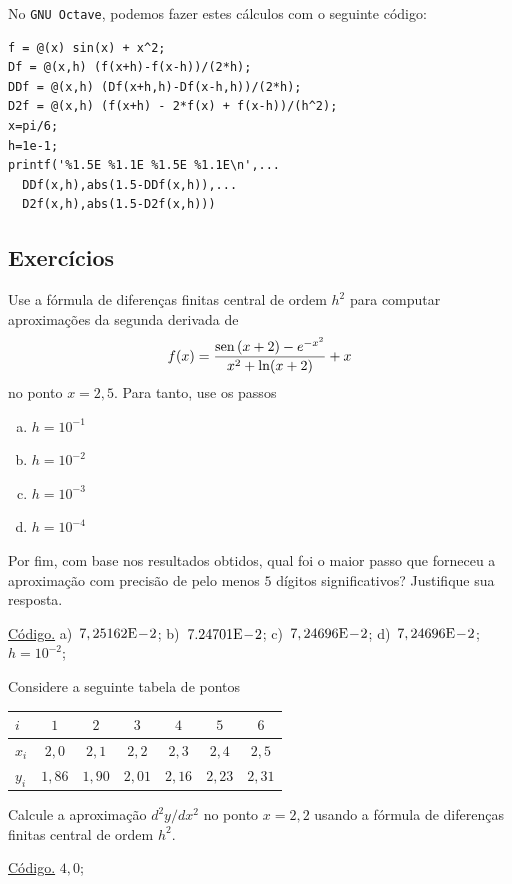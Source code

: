 \begin{ex}
No \verb+GNU Octave+, podemos fazer estes cálculos com o seguinte código:
\begin{verbatim}
f = @(x) sin(x) + x^2;
Df = @(x,h) (f(x+h)-f(x-h))/(2*h);
DDf = @(x,h) (Df(x+h,h)-Df(x-h,h))/(2*h);
D2f = @(x,h) (f(x+h) - 2*f(x) + f(x-h))/(h^2);
x=pi/6;
h=1e-1;
printf('%1.5E %1.1E %1.5E %1.1E\n',...
  DDf(x,h),abs(1.5-DDf(x,h)),...
  D2f(x,h),abs(1.5-D2f(x,h)))
\end{verbatim}
\end{ex}

\subsection*{Exercícios}

\begin{exer}\label{exer:d2fc_fun}
  Use a fórmula de diferenças finitas central de ordem $h^2$ para computar aproximações da segunda derivada de
  \begin{equation}
    f(x) = \frac{\operatorname{sen}\,(x+2) - e^{-x^2}}{x^2 + \ln(x+2)}+x
  \end{equation}
no ponto $x=2,5$. Para tanto, use os passos
\begin{enumerate}[a)]
\item $h=10^{-1}$
\item $h=10^{-2}$
\item $h=10^{-3}$
\item $h=10^{-4}$
\end{enumerate}
Por fim, com base nos resultados obtidos, qual foi o maior passo que forneceu a aproximação com precisão de pelo menos $5$ dígitos significativos? Justifique sua resposta.
\end{exer}
\begin{resp}
  \ifisoctave 
  \href{https://github.com/phkonzen/notas/blob/master/src/MatematicaNumerica/cap_deriv/dados/exer_d2fc_fun/exer_d2fc_fun.m}{Código.} 
  \fi
  a)~$7,25162\mathrm{E}\!-\!2$; b)~$7.24701\mathrm{E}\!-\!2$; c)~$7,24696\mathrm{E}\!-\!2$; d)~$7,24696\mathrm{E}\!-\!2$; $h=10^{-2}$;
\end{resp}

\begin{exer}\label{exer:d2fc_tab}
  Considere a seguinte tabela de pontos
  \begin{center}
    \begin{tabular}{l|cccccc}
      $i$ & $1$ & $2$ & $3$ & $4$ & $5$ & $6$ \\\hline
      $x_i$ & $2,0$ & $2,1$ & $2,2$ & $2,3$ & $2,4$ & $2,5$ \\
      $y_i$ & $1,86$ & $1,90$ & $2,01$ & $2,16$ & $2,23$ & $2,31$ \\\hline
    \end{tabular}
  \end{center}
Calcule a aproximação $d^2y/dx^2$ no ponto $x=2,2$ usando a fórmula de diferenças finitas central de ordem $h^2$.
\end{exer}
\begin{resp}
  \ifisoctave 
  \href{https://github.com/phkonzen/notas/blob/master/src/MatematicaNumerica/cap_deriv/dados/exer_d2fc_tab/exer_d2fc_tab.m}{Código.} 
  \fi
  $4,0$; 
\end{resp}


